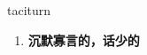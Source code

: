 
\begin{frame}
{\huge taciturn}
\begin{center}
\begin{enumerate}\Large
  \item \textbf{沉默寡言的，话少的}
\end{enumerate}
\end{center}
\end{frame}
